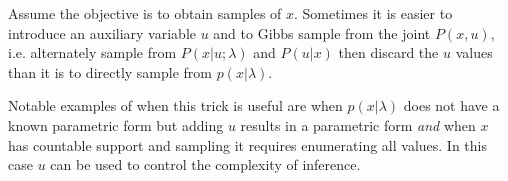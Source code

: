 Assume the objective is to obtain samples of $x$.  Sometimes it is easier to introduce an auxiliary variable $u$ and to Gibbs sample from the joint $P(x,u)$, i.e. alternately sample from $P(x|u; \lambda)$ and $P(u|x)$ then discard the $u$ values than it is to directly sample from $p(x|\lambda)$. \newline

Notable examples of when this trick is useful are when $p(x|\lambda)$ does not have a known parametric form but adding $u$ results in a parametric form {\em and} when $x$ has countable support and sampling it requires enumerating all values.  In this case $u$ can be used to control the complexity of inference.